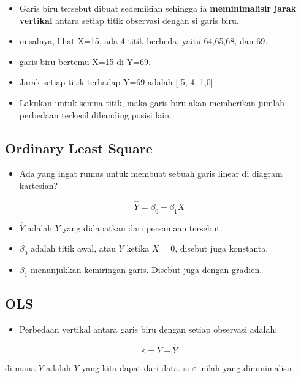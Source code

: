 \documentclass[
  letterpaper,
  DIV=11,
  numbers=noendperiod]{scrartcl}
\providecommand{\tightlist}{%
  \setlength{\itemsep}{0pt}\setlength{\parskip}{0pt}}\usepackage{longtable,booktabs,array}
\begin{document}
\begin{itemize}
\tightlist
\item
  Garis biru tersebut dibuat sedemikian sehingga ia
  \textbf{meminimalisir jarak vertikal} antara setiap titik observasi
  dengan si garis biru.
\item
  misalnya, lihat X=15, ada 4 titik berbeda, yaitu 64,65,68, dan 69.
\item
  garis biru bertemu X=15 di Y=69.
\item
  Jarak setiap titik terhadap Y=69 adalah {[}-5,-4,-1,0{]}
\item
  Lakukan untuk semua titik, maka garis biru akan memberikan jumlah
  perbedaan terkecil dibanding posisi lain.
\end{itemize}

\subsection{Ordinary Least Square}\label{ordinary-least-square}

\begin{itemize}
\tightlist
\item
  Ada yang ingat rumus untuk membuat sebuah garis linear di diagram
  kartesian?
\end{itemize}

\[
\hat{Y}=\beta_0+\beta_1 X
\]

\begin{itemize}
\item
  \(\hat{Y}\) adalah \(Y\) yang didapatkan dari persamaan tersebut.
\item
  \(\beta_0\) adalah titik awal, atau \(Y\) ketika \(X=0\), disebut juga
  konstanta.
\item
  \(\beta_1\) menunjukkan kemiringan garis. Disebut juga dengan gradien.
\end{itemize}

\subsection{OLS}\label{ols}

\begin{itemize}
\tightlist
\item
  Perbedaan vertikal antara garis biru dengan setiap observasi adalah:
\end{itemize}

\[
\varepsilon=Y-\hat{Y}
\]

di mana \(Y\) adalah \(Y\) yang kita dapat dari data. si \(\varepsilon\)
inilah yang diminimalisir.
\end{document}
